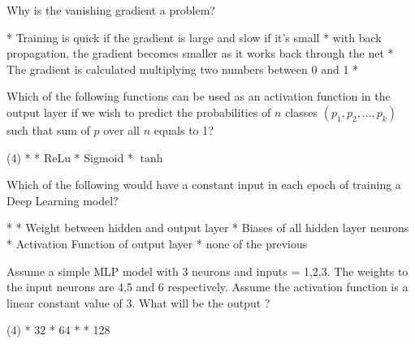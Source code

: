\documentclass[10pt]{extarticle}
\begin{document}
\begin{exercise}
    Why is the vanishing gradient a problem?
    \begin{choice}
        * Training is quick if the gradient is large and slow if it's small
        * with back propagation, the gradient becomes smaller as it works back through the net
        * The gradient is calculated multiplying two numbers between 0 and 1
        * 
    \end{choice}
\end{exercise}
\begin{solution}
\end{solution}

\begin{exercise}
    Which of the following functions can be used as an activation function in the output layer if we wish to predict the probabilities of \(n\) classes \((p_1,p_2,...,p_k)\) such that sum of \(p\) over all \(n\) equals to 1?
    \begin{choice} (4)
        * 
        * ReLu
        * Sigmoid
        * \(\tanh\)
    \end{choice}
\end{exercise}
\begin{solution}
\end{solution}

\begin{exercise}
    Which of the following would have a constant input in each epoch of training a Deep Learning model?
    \begin{choice}
        * 
        * Weight between hidden and output layer
        * Biases of all hidden layer neurons
        * Activation Function of output layer
        * none of the previous
    \end{choice}
\end{exercise}
\begin{solution}
\end{solution}

\begin{exercise}
    Assume a simple MLP model with 3 neurons and inputs = 1,2,3. The weights to the input neurons are 4,5 and 6 respectively. Assume the activation function is a linear constant value of 3. What will be the output ?
    \begin{choice} (4)
        * 32
        * 64
        * 
        * 128
    \end{choice}
\end{exercise}
\begin{solution}
\end{solution}
\end{document}
